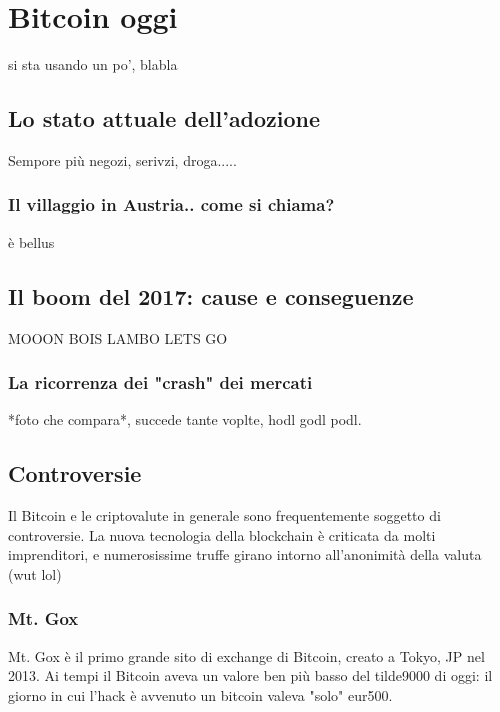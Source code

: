 \documentclass {article}
\begin{document}
\section {Bitcoin oggi}


si sta usando un po', blabla


\subsection {Lo stato attuale dell'adozione}


Sempore più negozi, serivzi, droga.....


\subsubsection {Il villaggio in Austria.. come si chiama?}


è bellus


\subsection {Il boom del 2017: cause e conseguenze}


MOOON BOIS LAMBO LETS GO


\subsubsection {La ricorrenza dei "crash" dei mercati}


*foto che compara*, succede tante voplte, hodl godl podl.


\subsection {Controversie}


Il Bitcoin e le criptovalute in generale sono frequentemente soggetto di controversie. La nuova tecnologia della blockchain è criticata da molti imprenditori, e numerosissime truffe girano intorno all'anonimità della valuta (wut lol)


\subsubsection {Mt. Gox}


Mt. Gox è il primo grande sito di exchange di Bitcoin, creato a Tokyo, JP nel 2013.
Ai tempi il Bitcoin aveva un valore ben più basso del tilde9000 di oggi: il giorno in cui l'hack è avvenuto un bitcoin valeva "solo" eur500.
\end{document}
